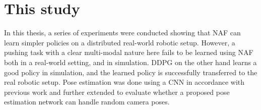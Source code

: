\section{This study}

In this thesis, a series of experiments were conducted showing that NAF can
learn simpler policies on a distributed real-world robotic setup. However, a
pushing task with a clear multi-modal nature here fails to be learned using NAF
both in a real-world setting, and in simulation. DDPG on the other hand learns
a good policy in simulation, and the learned policy is successfully transferred
to the real robotic setup. Pose estimation was done using a CNN in accordance
with previous work \cite{levine2016end,chebotar2016path,yahya2016collective}
and further extended to evaluate whether a proposed pose estimation network can
handle random camera poses.
